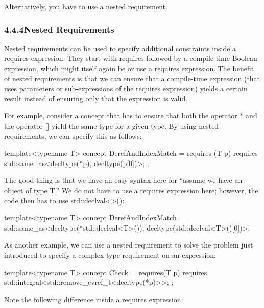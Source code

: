 Alternatively, you have to use a nested requirement.

\subsubsection*{ 4.4.4\hspace{0.2cm}Nested Requirements}

Nested requirements can be used to specify additional constraints inside a requires expression. They start with requires followed by a compile-time Boolean expression, which might itself again be or use a requires expression. The benefit of nested requirements is that we can ensure that a compile-time expression (that uses parameters or sub-expressions of the requires expression) yields a certain result instead of ensuring only that the expression is valid.

For example, consider a concept that has to ensure that both the operator * and the operator [] yield the same type for a given type. By using nested requirements, we can specify this as follows:

\begin{cpp}
template<typename T>
concept DerefAndIndexMatch = requires (T p) {
								requires std::same_as<decltype(*p),
										decltype(p[0])>;
							};
\end{cpp}

The good thing is that we have an easy syntax here for “assume we have an object of type T.” We do not have to use a requires expression here; however, the code then has to use std::declval<>():

\begin{cpp}
template<typename T>
concept DerefAndIndexMatch = std::same_as<decltype(*std::declval<T>()),
			 decltype(std::declval<T>()[0])>;
\end{cpp}

As another example, we can use a nested requirement to solve the problem just introduced to specify a complex type requirement on an expression:

\begin{cpp}
template<typename T>
concept Check = requires(T p) {
	requires std::integral<std::remove_cvref_t<decltype(*p)>>;
};
\end{cpp}

Note the following difference inside a requires expression:

